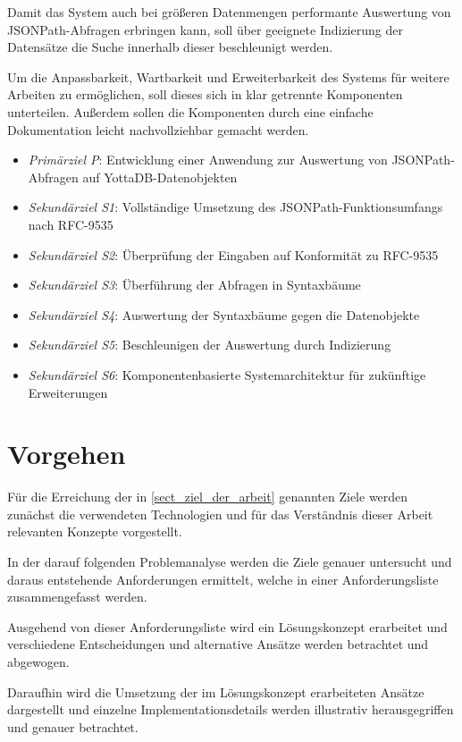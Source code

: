 \documentclass[oneside]{ausarbeitung}
\begin{document}
	Damit das System auch bei größeren Datenmengen performante Auswertung von JSONPath-Abfragen erbringen kann, soll über geeignete Indizierung der Datensätze die Suche innerhalb dieser beschleunigt werden. 
	
	Um die Anpassbarkeit, Wartbarkeit und Erweiterbarkeit des Systems für weitere Arbeiten zu ermöglichen, soll dieses sich in klar getrennte Komponenten unterteilen. Außerdem sollen die Komponenten durch eine einfache Dokumentation leicht nachvollziehbar gemacht werden.
	
	\begin{itemize}
		\item \textit{Primärziel P}: Entwicklung einer Anwendung zur Auswertung von JSONPath-Abfragen auf YottaDB-Datenobjekten
		\item \textit{Sekundärziel S1}: Vollständige Umsetzung des JSONPath-Funktionsumfangs nach RFC-9535
		\item \textit{Sekundärziel S2}: Überprüfung der Eingaben auf Konformität zu RFC-9535 
		\item \textit{Sekundärziel S3}: Überführung der Abfragen in Syntaxbäume
		\item \textit{Sekundärziel S4}: Auswertung der Syntaxbäume gegen die Datenobjekte
		\item \textit{Sekundärziel S5}: Beschleunigen der Auswertung durch Indizierung
		\item \textit{Sekundärziel S6}: Komponentenbasierte Systemarchitektur für zukünftige Erweiterungen
	\end{itemize}
	
	
	
	\section{Vorgehen}
	
	Für die Erreichung der in \ref{sect_ziel_der_arbeit} genannten Ziele werden zunächst die verwendeten Technologien und für das Verständnis dieser Arbeit relevanten Konzepte vorgestellt. 
	
	In der darauf folgenden Problemanalyse werden die Ziele genauer untersucht und daraus entstehende Anforderungen ermittelt, welche in einer Anforderungsliste zusammengefasst werden.
	
	Ausgehend von dieser Anforderungsliste wird ein Lösungskonzept erarbeitet und verschiedene Entscheidungen und alternative Ansätze werden betrachtet und abgewogen.
	
	Daraufhin wird die Umsetzung der im Lösungskonzept erarbeiteten Ansätze dargestellt und einzelne Implementationsdetails werden illustrativ herausgegriffen und genauer betrachtet.
	
\end{document}
